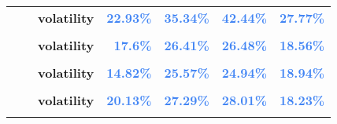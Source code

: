 \documentclass[
  authoryear,
  preprint,
  3p]{elsarticle}
\begin{document}
\begin{longtable}[t]{>{}l>{}l>{}l>{}r>{}r>{}r>{}r}
\textbf{} & \textbf{} & \textbf{volatility} & \textcolor[HTML]{4285f4}{\textbf{22.93\%}} & \textcolor[HTML]{4285f4}{\textbf{35.34\%}} & \textcolor[HTML]{4285f4}{\textbf{42.44\%}} & \textcolor[HTML]{4285f4}{\textbf{27.77\%}}\\
\textbf{\cellcolor{gray!10}{Aluminium (XLME)}} & \textbf{\cellcolor{gray!10}{whole period}} & \textbf{\cellcolor{gray!10}{mean}} & \textcolor[HTML]{4285f4}{\textbf{\cellcolor{gray!10}{1.13\%}}} & \textcolor[HTML]{4285f4}{\textbf{\cellcolor{gray!10}{13.78\%}}} & \textcolor[HTML]{4285f4}{\textbf{\cellcolor{gray!10}{-3.58\%}}} & \textcolor[HTML]{4285f4}{\textbf{\cellcolor{gray!10}{3.15\%}}}\\
\addlinespace
\textbf{} & \textbf{} & \textbf{volatility} & \textcolor[HTML]{4285f4}{\textbf{17.6\%}} & \textcolor[HTML]{4285f4}{\textbf{26.41\%}} & \textcolor[HTML]{4285f4}{\textbf{26.48\%}} & \textcolor[HTML]{4285f4}{\textbf{18.56\%}}\\
\textbf{\cellcolor{gray!10}{}} & \textbf{\cellcolor{gray!10}{backwardation}} & \textbf{\cellcolor{gray!10}{mean}} & \textcolor[HTML]{4285f4}{\textbf{\cellcolor{gray!10}{2.56\%}}} & \textcolor[HTML]{4285f4}{\textbf{\cellcolor{gray!10}{14.78\%}}} & \textcolor[HTML]{4285f4}{\textbf{\cellcolor{gray!10}{16.25\%}}} & \textcolor[HTML]{4285f4}{\textbf{\cellcolor{gray!10}{**23.68\%}}}\\
\textbf{} & \textbf{} & \textbf{volatility} & \textcolor[HTML]{4285f4}{\textbf{14.82\%}} & \textcolor[HTML]{4285f4}{\textbf{25.57\%}} & \textcolor[HTML]{4285f4}{\textbf{24.94\%}} & \textcolor[HTML]{4285f4}{\textbf{18.94\%}}\\
\textbf{\cellcolor{gray!10}{}} & \textbf{\cellcolor{gray!10}{contango}} & \textbf{\cellcolor{gray!10}{mean}} & \textcolor[HTML]{4285f4}{\textbf{\cellcolor{gray!10}{-0.38\%}}} & \textcolor[HTML]{4285f4}{\textbf{\cellcolor{gray!10}{12.86\%}}} & \textcolor[HTML]{4285f4}{\textbf{\cellcolor{gray!10}{-23.04\%}}} & \textcolor[HTML]{4285f4}{\textbf{\cellcolor{gray!10}{-16.74\%}}}\\
\textbf{} & \textbf{} & \textbf{volatility} & \textcolor[HTML]{4285f4}{\textbf{20.13\%}} & \textcolor[HTML]{4285f4}{\textbf{27.29\%}} & \textcolor[HTML]{4285f4}{\textbf{28.01\%}} & \textcolor[HTML]{4285f4}{\textbf{18.23\%}}\\
\addlinespace
\textbf{\cellcolor{gray!10}{Copper (XLME)}} & \textbf{\cellcolor{gray!10}{whole period}} & \textbf{\cellcolor{gray!10}{mean}} & \textcolor[HTML]{4285f4}{\textbf{\cellcolor{gray!10}{0.45\%}}} & \textcolor[HTML]{4285f4}{\textbf{\cellcolor{gray!10}{**28.59\%}}} & \textcolor[HTML]{4285f4}{\textbf{\cellcolor{gray!10}{5.74\%}}} & \textcolor[HTML]{4285f4}{\textbf{\cellcolor{gray!10}{0.03\%}}}\\

\end{longtable}
\end{document}
